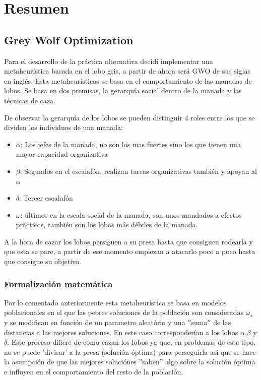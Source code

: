 \documentclass[a4paper, 12.5pt]{report}
\begin{document}
    \tableofcontents


    \section{Resumen}\label{sec:resumen}

    \subsection{Grey Wolf Optimization}

    Para el desarrollo de la práctica alternativa decidí implementar una metaheurística basada en el lobo gris, a partir de ahora será GWO de sus siglas en inglés. Esta metaheurísticas se basa en el comportamiento de las manadas de lobos. Se basa en dos premisas, la gerarquía social dentro de la manada y las técnicas de caza.

    De observar la gerarquía de los lobos se pueden distinguir 4 roles entre los que se dividen los individuos de una manada:
    \begin{itemize}
        \item $\alpha$: Los jefes de la manada, no son los mas fuertes sino los que tienen una mayor capacidad organizativa
        \item $\beta$: Segundos en el escalafón, realizan tareas organizativas también y apoyan al $\alpha$
        \item $\delta$: Tercer escalafón
        \item $\omega$: últimos en la escala social de la manada, son unos mandados a efectos prácticos, también son los lobos más débiles de la manada.
    \end{itemize}


    A la hora de cazar los lobos persiguen a su presa hasta que consiguen rodearla y que esta se pare, a partir de ese momento empiezan a atacarlo poco a poco hasta que consigue su objetivo.

    \subsubsection{Formalización matemática}
    Por lo comentado anteriormente esta metaheurística se basa en modelos poblacionales en el que las peores soluciones de la población son consideradas $\omega_s$ y se modifican en función de un parametro aleatório y una \(''\)suma\(''\) de las distancias a las mejores soluciones. En este caso corresponderían a los lobos $\alpha$,$\beta$ y $\delta$. Este proceso difiere de como cazan los lobos ya que, en problemas de este tipo, no se puede 'divisar' a la presa (solución óptima) para perseguirla asi que se hace la asumpción de que las mejores soluciónes ''saben'' algo sobre la solución óptima e influyen en el comportamiento del resto de la población.
\end{document}
